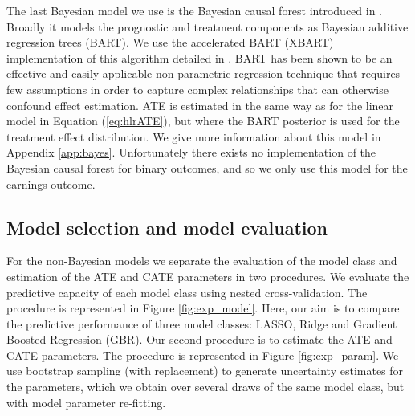 \documentclass[12pt, a4paper]{article}
\begin{document}
The last Bayesian model we use is the Bayesian causal forest introduced in
\citet{hahn2020}. Broadly it models the prognostic and treatment components as
Bayesian additive regression trees (BART). We use the accelerated BART (XBART)
implementation of this algorithm detailed in \citet{krantsevich2022}. BART
\citep{chipman2010} has been shown to be an effective and easily applicable
non-parametric regression technique that requires few assumptions in order to
capture complex relationships that can otherwise confound effect estimation.
ATE is estimated in the same way as for the linear model in Equation
(\ref{eq:hlrATE}), but where the BART posterior is used for the treatment
effect distribution. 
We give more information about this model in Appendix \ref{app:bayes}. 
Unfortunately there exists no implementation of the Bayesian
causal forest for binary outcomes, and so we only use this model for the
earnings outcome.




\subsection{Model selection and model evaluation}

For the non-Bayesian models we separate the evaluation of the model class and
estimation of the ATE and CATE parameters in two procedures. We evaluate the
predictive capacity of each model class using nested cross-validation. The
procedure is represented in Figure \ref{fig:exp_model}. Here, our aim is to
compare the predictive performance of three model classes: LASSO, Ridge and
Gradient Boosted Regression (GBR). Our second procedure is to estimate the ATE
and CATE parameters. The procedure is represented in Figure
\ref{fig:exp_param}. We use bootstrap sampling (with replacement) to generate
uncertainty estimates for the parameters, which we obtain over several draws of
the same model class, but with model parameter re-fitting.
\end{document}
